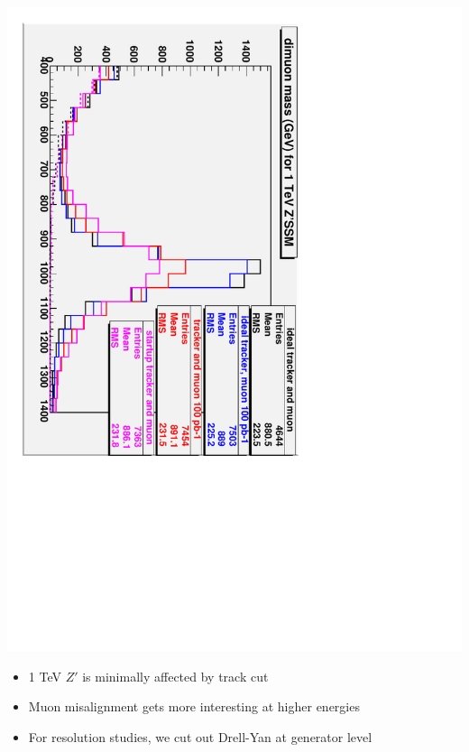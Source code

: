 \documentclass[compress]{beamer}
\begin{document}
\begin{frame}
\begin{center}
\includegraphics[height=0.9\linewidth, angle=90]{smear_1TeV.pdf}
\end{center}

\vspace{-0.25 cm}
\begin{itemize}
\item 1 TeV $Z'$ is minimally affected by track cut
\item Muon misalignment gets more interesting at higher energies
\item For resolution studies, we cut out Drell-Yan at generator level
\end{itemize}
\end{frame}

\end{document}
